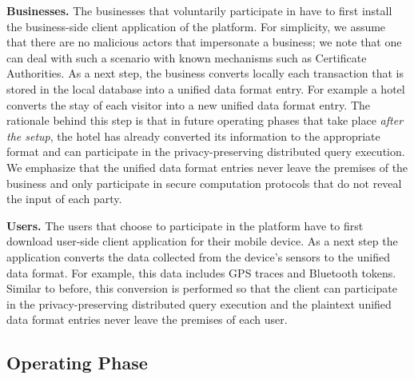 \textbf{Businesses. }The businesses that voluntarily participate in \sysname have to first install the business-side client application of the platform. For simplicity, we assume that there are no malicious actors that impersonate a business; we note that one can deal with such a scenario with known mechanisms such as Certificate Authorities.
As a next step, the business converts locally each transaction that is stored in the local database into a unified data format entry. 
For example a hotel converts the stay of each visitor into a new unified data format entry. 
The rationale behind this step is that in future operating phases that take place \emph{after the setup}, the hotel has already converted its information to the appropriate format and can participate in the privacy-preserving distributed query execution.  
We emphasize that the unified data format entries never leave the premises of the business and only participate in secure computation protocols that do not reveal the input of each party.



\textbf{Users. }The users that choose to participate in the platform have to first download user-side client application for their mobile device. As a next step the application converts the data collected from the device's sensors to the unified data format. 
For example, this data includes GPS traces and Bluetooth tokens. 
Similar to before, this conversion is performed so that the client can participate in the privacy-preserving distributed query execution and the plaintext unified data format entries never leave the premises of each user. 



\subsection{Operating Phase}


